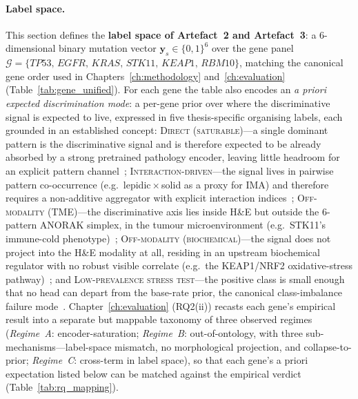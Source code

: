 \paragraph{Label space.}
This section defines the \textbf{label space of Artefact~2 and
Artefact~3}: a 6-dimensional binary mutation vector
$\mathbf{y}_s \in \{0,1\}^6$ over the gene panel
$\mathcal{G} = \{\textit{TP53},\allowbreak\, \textit{EGFR},\allowbreak\, \textit{KRAS},\allowbreak\, \textit{STK11},\allowbreak\, \textit{KEAP1},\allowbreak\, \textit{RBM10}\}$,
matching the canonical gene order used in Chapters~\ref{ch:methodology}
and~\ref{ch:evaluation} (Table~\ref{tab:gene_unified}).
For each gene the table also encodes an \emph{a priori expected
discrimination mode}: a per-gene prior over where the discriminative
signal is expected to live, expressed in five thesis-specific
organising labels, each grounded in an established concept:
\textsc{Direct (saturable)}---a single dominant pattern is the
discriminative signal and is therefore expected to be already absorbed
by a strong pretrained pathology encoder, leaving little headroom for
an explicit pattern channel~\cite{wang2022ctranspath,coudray2018classification};
\textsc{Interaction-driven}---the signal lives in pairwise pattern
co-occurrence (e.g.\ lepidic\,$\times$\,solid as a proxy for IMA)
and therefore requires a non-additive aggregator with explicit
interaction indices~\cite{grabisch2009aggregation};
\textsc{Off-modality (TME)}---the discriminative axis lies inside
H\&E but outside the 6-pattern ANORAK simplex, in the tumour
microenvironment (e.g.\ STK11's immune-cold
phenotype)~\cite{skoulidis2018stk11pd1};
\textsc{Off-modality (biochemical)}---the signal does not project
into the H\&E modality at all, residing in an upstream biochemical
regulator with no robust visible correlate (e.g.\ the KEAP1/NRF2
oxidative-stress pathway)~\cite{li2011keap1papillary,tcga2014luad};
and \textsc{Low-prevalence stress test}---the positive class is
small enough that no head can depart from the base-rate prior, the
canonical class-imbalance failure mode~\cite{lin2017focal}.
Chapter~\ref{ch:evaluation} (RQ2(ii)) recasts each gene's empirical
result into a separate but mappable taxonomy of three observed regimes
(\emph{Regime~A}: encoder-saturation; \emph{Regime~B}:
out-of-ontology, with three sub-mechanisms---label-space mismatch,
no morphological projection, and collapse-to-prior; \emph{Regime~C}:
cross-term in label space), so that each gene's a priori expectation
listed below can be matched against the empirical verdict
(Table~\ref{tab:rq_mapping}).

